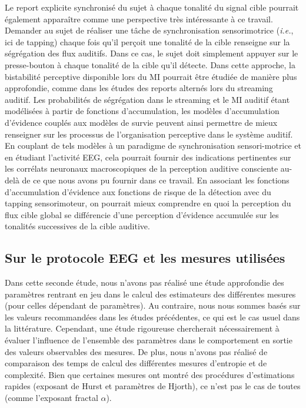 Le report explicite synchronisé du sujet à chaque tonalité du signal cible pourrait également apparaître comme une perspective très intéressante à ce travail. 
Demander au sujet de réaliser une tâche de synchronisation sensorimotrice (\textit{i.e.}, ici de tapping) chaque fois qu'il perçoit une tonalité de la cible renseigne sur la ségrégation des flux auditifs. 
Dans ce cas, le sujet doit simplement appuyer sur le presse-bouton à chaque tonalité de la cible qu'il détecte. 
Dans cette approche, la bistabilité perceptive disponible lors du MI pourrait être étudiée de manière plus approfondie, comme dans les études des reports alternés lors du streaming auditif. 
Les probabilités de ségrégation dans le streaming et le MI auditif étant modélisées à partir de fonctions d'accumulation, les modèles d'accumulation d'évidence couplés aux modèles de survie peuvent ainsi permettre de mieux renseigner sur les processus de l'organisation perceptive dans le système auditif. 
En couplant de tels modèles à un paradigme de synchronisation sensori-motrice et en étudiant l'activité EEG, cela pourrait fournir des indications pertinentes sur les corrélats neuronaux macroscopiques de la perception auditive consciente au-delà de ce que nous avons pu fournir dans ce travail. 
En associant les fonctions d'accumulation d'évidence aux fonctions de risque de la détection avec du tapping sensorimoteur, on pourrait mieux comprendre en quoi la perception du flux cible global se différencie d'une perception d'évidence accumulée sur les tonalités successives de la cible auditive. 

\subsection{Sur le protocole EEG et les mesures utilisées}

Dans cette seconde étude, nous n'avons pas réalisé une étude approfondie des paramètres rentrant en jeu dans le calcul des estimateurs des différentes mesures (pour celles dépendant de paramètres). 
Au contraire, nous nous sommes basés sur les valeurs recommandées dans les études précédentes, ce qui est le cas usuel dans la littérature. 
Cependant, une étude rigoureuse chercherait nécessairement à évaluer l'influence de l'ensemble des paramètres dans le comportement en sortie des valeurs observables des mesures. 
De plus, nous n'avons pas réalisé de comparaison des temps de calcul des différentes mesures d'entropie et de complexité. 
Bien que certaines mesures ont montré des procédures d'estimations rapides (exposant de Hurst et paramètres de Hjorth), ce n'est pas le cas de toutes (comme l'exposant fractal $\alpha$).

